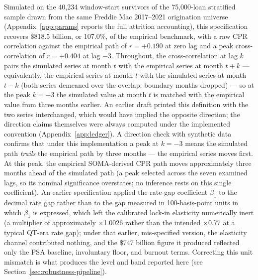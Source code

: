 \documentclass[12pt]{article}
\begin{document}
Simulated on the 40,234 window-start survivors of the 75,000-loan stratified sample drawn from the same Freddie Mac 2017--2021 origination universe (Appendix~\ref{app:params} reports the full attrition accounting), this specification recovers \$818.5 billion, or 107.0\%, of the empirical benchmark, with a raw CPR correlation against the empirical path of $r = +0.190$ at zero lag and a peak cross-correlation of $r = +0.404$ at lag $-3$. Throughout, the cross-correlation at lag $k$ pairs the simulated series at month $t$ with the empirical series at month $t+k$ --- equivalently, the empirical series at month $t$ with the simulated series at month $t-k$ (both series demeaned over the overlap; boundary months dropped) --- so at the peak $k=-3$ the simulated value at month $t$ is matched with the empirical value from three months earlier. An earlier draft printed this definition with the two series interchanged, which would have implied the opposite direction; the direction claims themselves were always computed under the implemented convention (Appendix~\ref{app:ledger}). A direction check with synthetic data confirms that under this implementation a peak at $k=-3$ means the simulated path \emph{trails} the empirical path by three months --- the empirical series moves first. At this peak, the empirical SOMA-derived CPR path moves approximately three months ahead of the simulated path (a peak selected across the seven examined lags, so its nominal significance overstates; no inference rests on this single coefficient). An earlier specification applied the rate-gap coefficient $\beta_1$ to the decimal rate gap rather than to the gap measured in 100-basis-point units in which $\beta_1$ is expressed, which left the calibrated lock-in elasticity numerically inert (a multiplier of approximately $\times$1.0026 rather than the intended $\times$0.77 at a typical QT-era rate gap); under that earlier, mis-specified version, the elasticity channel contributed nothing, and the \$747 billion figure it produced reflected only the PSA baseline, involuntary floor, and burnout terms. Correcting this unit mismatch is what produces the level and band reported here (see Section~\ref{sec:robustness-pipeline}).
\end{document}
